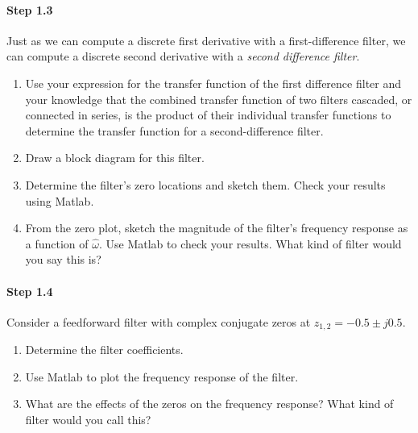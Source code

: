 \paragraph{Step 1.3} Just as we can compute a discrete first
derivative with a first-difference filter, we can compute a discrete
second derivative with a \emph{second difference filter}.

\begin{enumerate}\renewcommand{\theenumi}{\alph{enumi}}
\item Use your expression for the transfer function of the first
	  difference filter and your knowledge that the combined transfer
	  function of two filters cascaded, or connected in series, is the
	  product of their individual transfer functions to determine the
	  transfer function for a second-difference filter.


\item Draw a block diagram for this filter.
	

\item Determine the filter's zero locations and sketch them. Check
	  your results using Matlab.
	  
	  

\item From the zero plot, sketch the magnitude of the filter's
          frequency response as a function of $\hat{\omega}$. Use
          Matlab to check your results. What kind of filter would you
          say this is?


\end{enumerate}


\paragraph{Step 1.4} Consider a feedforward filter with complex
conjugate zeros at $z_{1,2} = -0.5 \pm j 0.5$.

\begin{enumerate}\renewcommand{\theenumi}{\alph{enumi}}
\item Determine the filter coefficients.


\item Use Matlab to plot the frequency response of the filter.

\item What are the effects of the zeros on the frequency response?
	  What kind of filter would you call this?

\end{enumerate}

